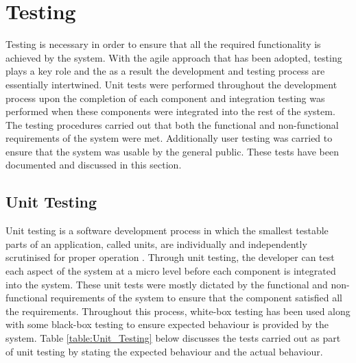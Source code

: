 \section{Testing} \label{Section:Testing}
Testing is necessary in order to ensure that all the required functionality is achieved by the system. With the agile approach that has been adopted, testing plays a key role and the as a result the development and testing process are essentially intertwined. Unit tests were performed throughout the development process upon the completion of each component and integration testing was performed when these components were integrated into the rest of the system. The testing procedures carried out that both the functional and non-functional requirements of the system were met. Additionally user testing was carried to ensure that the system was usable by the general public. These tests have been documented and discussed in this section.


\subsection{Unit Testing}
Unit testing is a software development process in which the smallest testable parts of an application, called units, are individually and independently scrutinised for proper operation \cite{TechTarget:UnitTesting}. Through unit testing, the developer can test each aspect of the system at a micro level before each component is integrated into the system. These unit tests were mostly dictated by the functional and non-functional requirements of the system to ensure that the component satisfied all the requirements. Throughout this process, white-box testing has been used along with some black-box testing to ensure expected behaviour is provided by the system. Table \ref{table:Unit_Testing} below discusses the tests carried out as part of unit testing by stating the expected behaviour and the actual behaviour.

